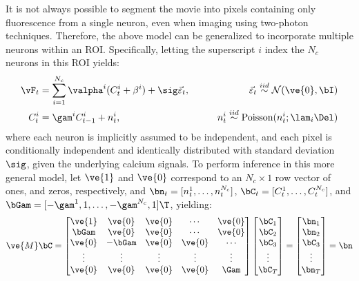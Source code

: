 It is not always possible to segment the movie into pixels containing only fluorescence from a single neuron, even when imaging using two-photon techniques.  Therefore, the above model can be generalized to incorporate multiple neurons within an ROI.   Specifically, letting the superscript $i$ index the $N_c$ neurons in this ROI yields:  
\begin{align} \label{eq:overlapping}
\vF_t &= \sum_{i=1}^{N_c}\valpha^i (C^i_t + \beta^i) +  \sig\vec{\varepsilon}_t, \qquad &\vec{\varepsilon}_t \overset{iid}{\sim} \mathcal{N}(\ve{0},\bI)   \\
C^i_t &= \gam^i C^i_{t-1} + n^i_t, & n^i_t \overset{iid}{\sim} \text{Poisson}(n^i_t; \lam_i \Del)
\end{align}
\noindent where each neuron is implicitly assumed to be independent, and each pixel is conditionally independent and identically distributed with standard deviation $\sig$, given the underlying calcium signals.  To perform inference in this more general model, let $\ve{1}$ and $\ve{0}$ correspond to an $N_c \times 1$ row vector of ones, and zeros, respectively, and $\bn_t=[n^1_t, \ldots, n^{N_c}_t]$, $\bC_t=[C^1_t, \ldots, C^{N_c}_t]$, and $\bGam=[-\gam^1, 1, \ldots, -\gam^{N_c}, 1]\T$, yielding:
\begin{align} \label{eq:M2}
\ve{M} \bC = %
\begin{bmatrix}
\ve{1} & \ve{0} & \ve{0}  & \cdots & \ve{0} \\
\bGam & \ve{0} & \ve{0} &  \cdots & \ve{0} \\
\ve{0} & -\bGam & \ve{0} & \ve{0} & \cdots  \\
\vdots & \vdots & \vdots & \vdots & \vdots \\ %
\ve{0} & \ve{0} & \ve{0} & \ve{0} & \Gam %
\end{bmatrix}
\begin{bmatrix}
\bC_1 \\ \bC_2  \\ \bC_3 \\ \vdots \\ \bC_T  
\end{bmatrix}
= 
\begin{bmatrix}
\bn_1 \\ \bn_2  \\ \bC_3 \\ \vdots \\ \bn_T
\end{bmatrix}
= \bn
\end{align}
